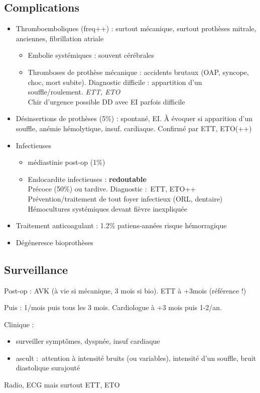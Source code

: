 \subsection{Complications}
\begin{itemize}
  \item Thromboemboliques (freq++) : surtout mécanique, surtout prothèses mitrale,
    anciennes, fibrillation atriale
    \begin{itemize}
      \item Embolie systémiques : souvent cérébrales
      \item Thromboses de prothèse mécanique : accidents brutaux (OAP, syncope,
        choc, mort subite). Diagnostic difficile : appartition d'un
        souffle/roulement. \textit{ETT, ETO} \\
        Chir d'urgence possible
        \danger DD avec EI parfois difficile
    \end{itemize}
  \item Désinsertions de prothèses (5\%) : spontané, EI. À évoquer si apparition d'un
    souffle, anémie hémolytique, insuf. cardiaque. Confirmé par ETT, ETO(++)

  \item Infectieuses
    \begin{itemize}
      \item médiastinie post-op (1\%)
      \item Endocardite infectieuses : \textbf{redoutable} \skull\\
        Précoce (50\%) ou tardive. Diagnostic : ETT, ETO++\\
        Prévention/traitement de tout foyer infectieux (ORL, dentaire)\\
        Hémocultures systémiques devant fièvre inexpliquée
    \end{itemize}
  \item Traitement anticoagulant : 1.2\% patiens-années risque hémorragique
  \item Dégéneresce bioprothèses
\end{itemize}

\subsection{Surveillance}
Post-op : AVK (à vie si mécanique, 3 mois si bio). ETT à +3mois (référence !)

Puis : 1/mois puis tous les 3 mois. Cardiologue à +3 mois puis 1-2/an.

Clinique : 
\begin{itemize}
  \item surveiller symptômes, dyspnée, insuf cardiaque
  \item ascult : attention à \dec intensité bruits (ou variables), \inc
    intensité d'un souffle, bruit diastolique surajouté
\end{itemize}
Radio, ECG mais surtout ETT, ETO

